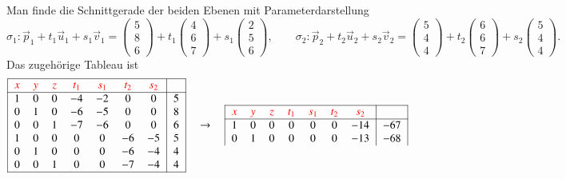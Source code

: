 \begin{beispiel}
Man finde die Schnittgerade der beiden Ebenen mit Parameterdarstellung
\[
\sigma_1:
\vec p_1+t_1\vec u_1+s_1\vec v_1
=\begin{pmatrix}5\\8\\6\end{pmatrix}
+t_1\begin{pmatrix}4\\6\\7\end{pmatrix}
+s_1\begin{pmatrix}2\\5\\6\end{pmatrix}
,
\qquad
\sigma_2:
\vec p_2+t_2\vec u_2+s_2\vec v_2
=\begin{pmatrix}5\\4\\4\end{pmatrix}
+t_2\begin{pmatrix}6\\6\\7\end{pmatrix}
+s_2\begin{pmatrix}5\\4\\4\end{pmatrix}.
\]
Das zugehörige Tableau ist
\[
\begin{tabular}{|
>{$}c<{$}
>{$}c<{$}
>{$}c<{$}
>{$}c<{$}
>{$}c<{$}
>{$}c<{$}
>{$}c<{$}|
>{$}c<{$}|}
\hline
\color{red}x&
\color{red}y&
\color{red}z&
\color{red}t_1&
\color{red}s_1&
\color{red}t_2&
\color{red}s_2&\\
\hline
1&0&0&-4&-2& 0& 0&5\\
0&1&0&-6&-5& 0& 0&8\\
0&0&1&-7&-6& 0& 0&6\\
1&0&0& 0& 0&-6&-5&5\\
0&1&0& 0& 0&-6&-4&4\\
0&0&1& 0& 0&-7&-4&4\\
\hline
\end{tabular}
\quad\rightarrow\quad
\begin{tabular}{|
>{$}c<{$}
>{$}c<{$}
>{$}c<{$}
>{$}c<{$}
>{$}c<{$}
>{$}c<{$}
>{$}c<{$}|
>{$}c<{$}|}
\hline
\color{red}x&
\color{red}y&
\color{red}z&
\color{red}t_1&
\color{red}s_1&
\color{red}t_2&
\color{red}s_2&\\
\hline
1&0&0&0&0&0&-14        &-67\\
0&1&0&0&0&0&-13        &-68\\

\end{tabular}\]
\end{beispiel}
